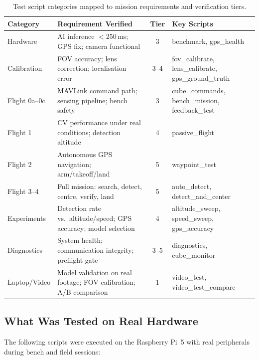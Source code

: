 \begin{table}[H]
\centering
\caption{Test script categories mapped to mission requirements and verification tiers.}
\label{tab:script-req-map}
\small
\begin{tabular}{@{}p{2.8cm}p{4.5cm}cp{3.8cm}@{}}
\toprule
\textbf{Category} & \textbf{Requirement Verified} & \textbf{Tier} & \textbf{Key Scripts} \\
\midrule
Hardware & AI inference $<$250\,ms; GPS fix; camera functional & 3 & benchmark, gps\_health \\
\addlinespace
Calibration & FOV accuracy; lens correction; localisation error & 3--4 & fov\_calibrate, lens\_calibrate, gps\_ground\_truth \\
\addlinespace
Flight 0a--0c & MAVLink command path; sensing pipeline; bench safety & 3 & cube\_commands, bench\_mission, feedback\_test \\
\addlinespace
Flight 1 & CV performance under real conditions; detection altitude & 4 & passive\_flight \\
\addlinespace
Flight 2 & Autonomous GPS navigation; arm/takeoff/land & 5 & waypoint\_test \\
\addlinespace
Flight 3--4 & Full mission: search, detect, centre, verify, land & 5 & auto\_detect, detect\_and\_center \\
\addlinespace
Experiments & Detection rate vs.\ altitude/speed; GPS accuracy; model selection & 4 & altitude\_sweep, speed\_sweep, gps\_accuracy \\
\addlinespace
Diagnostics & System health; communication integrity; preflight gate & 3--5 & diagnostics, cube\_monitor \\
\addlinespace
Laptop/Video & Model validation on real footage; FOV calibration; A/B comparison & 1 & video\_test, video\_test\_compare \\
\bottomrule
\end{tabular}
\end{table}

\subsection{What Was Tested on Real Hardware}\label{sec:tested-real}

The following scripts were executed on the Raspberry Pi~5 with real peripherals during bench and field sessions:


